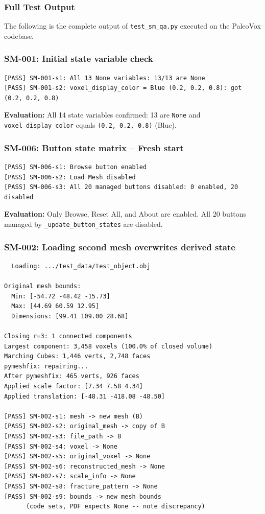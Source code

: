 \documentclass[12pt,a4paper]{article}
\begin{document}
\subsubsection{Full Test Output}

The following is the complete output of \texttt{test\_sm\_qa.py} executed on
the PaleoVox codebase.

\subsubsection{SM-001: Initial state variable check}

\begin{lstlisting}
[PASS] SM-001-s1: All 13 None variables: 13/13 are None
[PASS] SM-001-s2: voxel_display_color = Blue (0.2, 0.2, 0.8): got (0.2, 0.2, 0.8)
\end{lstlisting}

\textbf{Evaluation:} All 14 state variables confirmed:
13 are \texttt{None} and \texttt{voxel\_display\_color} equals \texttt{(0.2, 0.2, 0.8)} (Blue).

\subsubsection{SM-006: Button state matrix -- Fresh start}

\begin{lstlisting}
[PASS] SM-006-s1: Browse button enabled
[PASS] SM-006-s2: Load Mesh disabled
[PASS] SM-006-s3: All 20 managed buttons disabled: 0 enabled, 20 disabled
\end{lstlisting}

\textbf{Evaluation:} Only Browse, Reset All, and About are enabled.
All 20 buttons managed by \texttt{\_update\_button\_states} are disabled.

\newpage

\subsubsection{SM-002: Loading second mesh overwrites derived state}

\begin{lstlisting}
  Loading: .../test_data/test_object.obj

Original mesh bounds:
  Min: [-54.72 -48.42 -15.73]
  Max: [44.69 60.59 12.95]
  Dimensions: [99.41 109.00 28.68]

Closing r=3: 1 connected components
Largest component: 3,458 voxels (100.0% of closed volume)
Marching Cubes: 1,446 verts, 2,748 faces
pymeshfix: repairing...
After pymeshfix: 465 verts, 926 faces
Applied scale factor: [7.34 7.58 4.34]
Applied translation: [-48.31 -418.08 -48.50]

[PASS] SM-002-s1: mesh -> new mesh (B)
[PASS] SM-002-s2: original_mesh -> copy of B
[PASS] SM-002-s3: file_path -> B
[PASS] SM-002-s4: voxel -> None
[PASS] SM-002-s5: original_voxel -> None
[PASS] SM-002-s6: reconstructed_mesh -> None
[PASS] SM-002-s7: scale_info -> None
[PASS] SM-002-s8: fracture_pattern -> None
[PASS] SM-002-s9: bounds -> new mesh bounds
      (code sets, PDF expects None -- note discrepancy)
\end{lstlisting}
\end{document}
